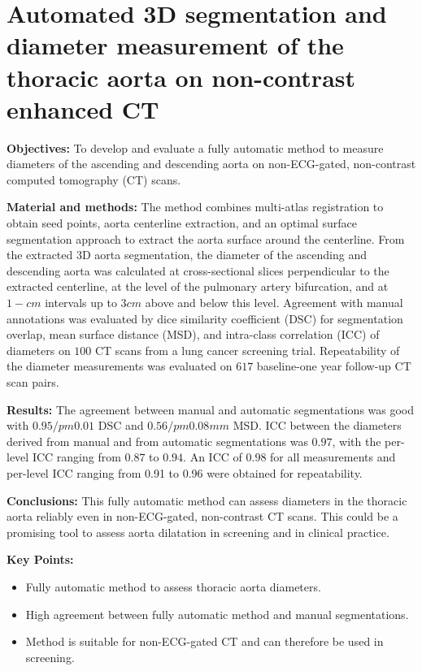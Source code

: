 
\chapter[Automated 3D segmentation and diameter measurement of the thoracic aorta on non-contrast enhanced CT][LGG location molecular subgroups]{Automated 3D segmentation and diameter measurement of the thoracic aorta on non-contrast enhanced CT}\label{chap:Aorta_Segmentation}


\begin{ChapterAbstract}
    \textbf{Objectives:} To develop and evaluate a fully automatic method to measure diameters of the ascending and descending aorta on non-ECG-gated, non-contrast computed tomography (\gls{CT}) scans.

    \textbf{Material and methods:}
    The method combines multi-atlas registration to obtain seed points, aorta centerline extraction, and an optimal surface segmentation approach to extract the aorta surface around the centerline. From the extracted 3D aorta segmentation, the diameter of the ascending and descending aorta was calculated at cross-sectional slices perpendicular to the extracted centerline, at the level of the pulmonary artery bifurcation, and at $1-cm$ intervals up to $3 cm$ above and below this level.
Agreement with manual annotations was evaluated by dice similarity coefficient (DSC) for segmentation overlap, mean surface distance (MSD), and intra-class correlation (ICC) of diameters on $100$ CT scans from a lung cancer screening trial. Repeatability of the diameter measurements was evaluated on $617$ baseline-one year follow-up CT scan pairs.

    \textbf{Results:}
   The agreement between manual and automatic segmentations was good with $0.95 /pm 0.01$ DSC and $0.56 /pm 0.08 mm$ MSD. ICC between the diameters derived from manual and from automatic segmentations was $0.97$, with the per-level ICC ranging from $0.87$ to $0.94$. An ICC of $0.98$ for all measurements and per-level ICC ranging from 0.91 to 0.96 were obtained for repeatability.

    \textbf{Conclusions:}
    This fully automatic method can assess diameters in the thoracic aorta reliably even in non-ECG-gated, non-contrast CT scans. This could be a promising tool to assess aorta dilatation in screening and in clinical practice.
    
    \textbf{Key Points:}
    \begin{itemize}
    \item Fully automatic method to assess thoracic aorta diameters.
    \item High agreement between fully automatic method and manual segmentations.
    \item Method is suitable for non-ECG-gated CT and can therefore be used in screening.
	\end{itemize}

\end{ChapterAbstract}

